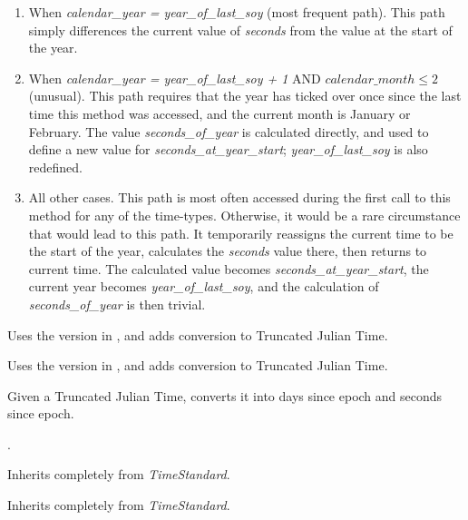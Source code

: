 {\begin{enumerate}
{\begin{enumerate}
\begin{enumerate}
	\item When \textit{calendar\_year = year\_of\_last\_soy} (most
	frequent path).  This path simply differences the current value of
	\textit{seconds} from the value at the start of the year.
	\item When \textit{calendar\_year = year\_of\_last\_soy + 1} AND
  $calendar\_month \leqslant 2$ (unusual).  This path requires that the year
  has ticked over once since the last time this method was accessed, and the
  current month is January or February.  The value \textit{seconds\_of\_year}
  is calculated directly, and used to define a new value for
  \textit{seconds\_at\_year\_start}; \textit{year\_of\_last\_soy} is also
  redefined.
	\item All other cases.  This path is most often accessed during the
	first call to this method for any of the time-types.  Otherwise, it
	would be a rare circumstance that would lead to this path.  It
	temporarily reassigns the current time to be the start of the year,
	calculates the \textit{seconds} value there, then returns to current
	time.  The calculated value becomes \textit{seconds\_at\_year\_start},
	the current year becomes \textit{year\_of\_last\_soy}, and the
	calculation of \textit{seconds\_of\_year} is then trivial.
\end{enumerate}




Uses the version in , and adds conversion to
Truncated Julian Time.

Uses the version in , and adds conversion to
Truncated Julian Time.

Given a Truncated Julian Time, converts it into days since epoch and
seconds since epoch.





\end{enumerate}}

  .


Inherits completely from \textit{TimeStandard}.



Inherits completely from \textit{TimeStandard}.



\end{enumerate}}

